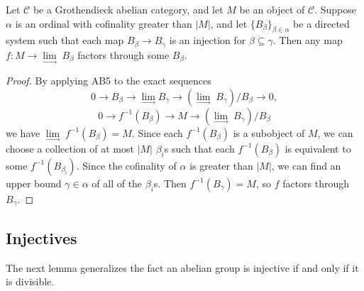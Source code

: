 \begin{lem}\label{alpha-small} Let $\mathcal{C}$ be a Grothendieck abelian category, and let $M$ be an object of $\mathcal{C}$. Suppose $\alpha$ is an ordinal with cofinality greater than $|M|$, and let $\{B_\beta\}_{\beta \in \alpha}$ be a directed system such that each map $B_\beta\rightarrow B_\gamma$ is an injection for $\beta\subseteq\gamma$. Then any map $f:M\rightarrow \underset{\longrightarrow}{\lim}\;B_\beta$ factors through some $B_\beta$.
\end{lem}
\begin{proof} By applying AB5 to the exact sequences
\[
0\rightarrow B_\beta \rightarrow \underset{\longrightarrow}{\lim}B_\gamma \rightarrow (\underset{\longrightarrow}{\lim}\;B_\gamma)/B_\beta \rightarrow 0,
\]
\[
0\rightarrow f^{-1}(B_\beta) \rightarrow M \rightarrow (\underset{\longrightarrow}{\lim}\;B_\gamma)/B_\beta
\]
we have $\underset{\longrightarrow}{\lim}\;f^{-1}(B_\beta) = M$. Since each $f^{-1}(B_{\beta})$ is a subobject of $M$, we can choose a collection of at most $|M|$ $\beta_i$s such that each $f^{-1}(B_\beta)$ is equivalent to some $f^{-1}(B_{\beta_i})$. Since the cofinality of $\alpha$ is greater than $|M|$, we can find an upper bound $\gamma\in\alpha$ of all of the $\beta_i$s. Then $f^{-1}(B_\gamma) = M$, so $f$ factors through $B_\gamma$.
\end{proof}

\subsection{Injectives}

The next lemma generalizes the fact an abelian group is injective if and only if it is divisible.

